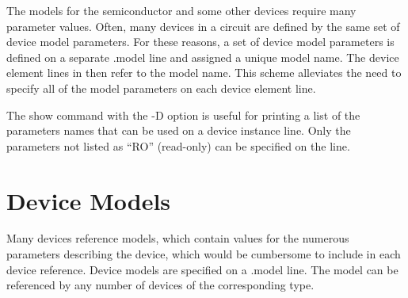 The models for the semiconductor and some other devices require many
parameter values.  Often, many devices in a circuit are defined by the
same set of device model parameters.  For these reasons, a set of
device model parameters is defined on a separate {\vt .model} line and
assigned a unique model name.  The device element lines in {\WRspice}
then refer to the model name.  This scheme alleviates the need to
specify all of the model parameters on each device element line.

The {\cb show} command with the {\vt -D} option is useful for
printing a list of the parameters names that can be used on a device
instance line.  Only the parameters not listed as ``{\vt RO}''
(read-only) can be specified on the line.

\section{Device Models}
\label{dotmodel}


Many devices reference models, which contain values for the numerous
parameters describing the device, which would be cumbersome to include
in each device reference.  Device models are specified on a {\vt .model}
line.  The model can be referenced by any number of devices of the
corresponding type.


